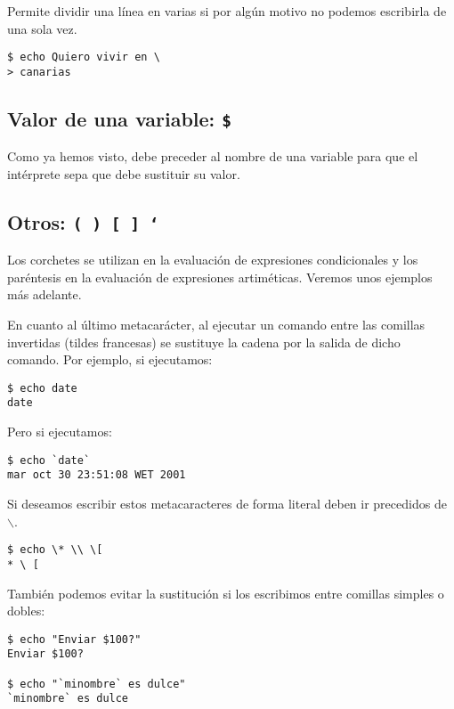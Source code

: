 Permite dividir  una línea en  varias si  por algún motivo  no podemos
escribirla de una sola vez.

\begin{verbatim}
$ echo Quiero vivir en \
> canarias
\end{verbatim}
        

\subsection{Valor de una variable: {\tt \$}}

Como ya hemos visto, debe preceder  al nombre de una variable para que
el intérprete sepa que debe sustituir su valor.


\subsection{Otros: {\tt ( ) [ ] `}}

Los   corchetes  se   utilizan   en  la   evaluación  de   expresiones
condicionales  y  los  paréntesis  en  la  evaluación  de  expresiones
artiméticas. Veremos unos ejemplos más adelante.

En cuanto  al último  metacarácter, al ejecutar  un comando  entre las
comillas invertidas (tildes  francesas) se sustituye la  cadena por la
salida de dicho comando. Por ejemplo, si ejecutamos:

\begin{verbatim}
$ echo date
date
\end{verbatim}

Pero si ejecutamos:

\begin{verbatim}
$ echo `date`
mar oct 30 23:51:08 WET 2001
\end{verbatim}

Si deseamos  escribir estos metacaracteres  de forma literal  deben ir
precedidos de {\tt $\backslash$}.

\begin{verbatim}
$ echo \* \\ \[
* \ [
\end{verbatim}

También podemos evitar la sustitución si los escribimos entre comillas
simples o dobles:

\begin{verbatim}
$ echo "Enviar $100?"
Enviar $100?

$ echo "`minombre` es dulce"
`minombre` es dulce
\end{verbatim}

